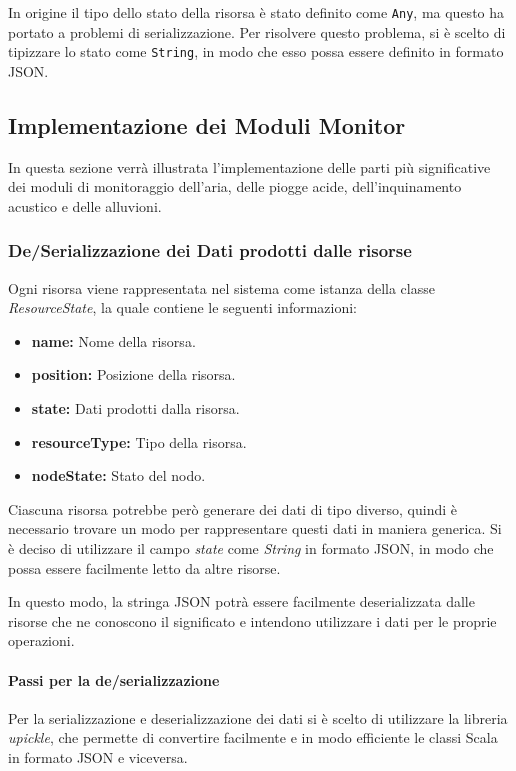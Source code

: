 \documentclass{scrartcl}
\begin{document}
In origine il tipo dello stato della risorsa è stato definito come \verb|Any|, ma questo ha portato a problemi di serializzazione. Per risolvere questo problema, si è scelto di tipizzare lo stato come \verb|String|, in modo che esso possa essere definito in formato JSON.

\subsection{Implementazione dei Moduli Monitor}
In questa sezione verrà illustrata l'implementazione delle parti più significative dei moduli di monitoraggio dell'aria, delle piogge acide, dell'inquinamento acustico e delle alluvioni.

\subsubsection{De/Serializzazione dei Dati prodotti dalle risorse}
Ogni risorsa viene rappresentata nel sistema come istanza della classe \textit{ResourceState}, la quale contiene le seguenti informazioni:
\begin{itemize}
    \item \textbf{name:} Nome della risorsa.
    \item \textbf{position:} Posizione della risorsa.
    \item \textbf{state:} Dati prodotti dalla risorsa.
    \item \textbf{resourceType:} Tipo della risorsa.
    \item \textbf{nodeState:} Stato del nodo.
\end{itemize}
Ciascuna risorsa potrebbe però generare dei dati di tipo diverso, quindi è necessario trovare un modo per rappresentare questi dati in maniera generica.
Si è deciso di utilizzare il campo \textit{state} come \textit{String} in formato JSON, in modo che possa essere facilmente letto da altre risorse.

In questo modo, la stringa JSON potrà essere facilmente deserializzata dalle risorse che ne conoscono il significato e intendono utilizzare i dati per le proprie operazioni.

\paragraph{Passi per la de/serializzazione}
Per la serializzazione e deserializzazione dei dati si è scelto di utilizzare la libreria \textit{upickle}\cite{upickle}, che permette di convertire facilmente e in modo efficiente le classi Scala in formato JSON e viceversa.
\end{document}
